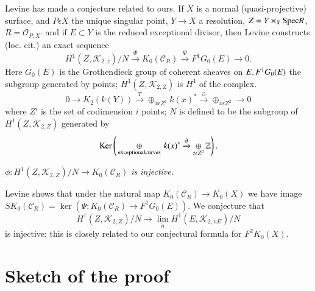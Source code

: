 Levine has made  a conjecture related to ours. If $X$ is a normal (quasi-projective) surface, and $P\epsilon X$ the unique singular point, $Y\to X$ a resolution, $Z=Y\times_{X}\spec R$, $R=\mathscr{O}_{P,X'}$ and if $E\subset Y$ is the reduced exceptional divisor, then Levine constructs (loc. cit.) an exact sequence 
$$
H^{1}(Z, \mathscr{K}_{2, z})/N \xrightarrow{\Phi} K_0(\mathscr{C}_R)\xrightarrow{\Psi} F^{1}G_0(E)\to 0. 
$$
Here $G_0(E)$ is the Grothendieck group of coherent sheaves on $E, F^{1}\\ G_0(E)$ the subgroup generated by points; $H^{1}(Z, \mathscr{K}_{2, Z})$ is $H^{1}$ of the complex. 
$$
0\to K_2(k(Y))\xrightarrow{T} \displaystyle\mathop{\oplus}_{x \epsilon Z^{1}} k(x)^{\ast} \xrightarrow{\partial} \displaystyle\mathop{\oplus}_{x \epsilon Z^{2}}\to 0
$$
where $Z^{i}$ is the set of codimension $i$ points; $N$ is defined to be the subgroup of $H^{1}(Z, \mathscr{K}_{2, Z})$ generated by 
$$
\ker \left(\displaystyle\mathop{\oplus}_{\text{ exceptional\\curves }}k(x)^{\ast}\xrightarrow{\partial}\displaystyle\mathop{\oplus}_{z \epsilon Z^{2}} \mathbb{Z}\right).
$$

\begin{conj} \textit{$\phi:H^{1}(Z, \mathscr{K}_{2, Z})/N\to K_0(\mathscr{C}_R)$ is injective.}\pageoriginale

Levine shows that under the natural map $K_0(\mathscr{C}_R)\to K_0(X)$ we have image $SK_0(\mathscr{C}_R)=\ker (\Psi: K_0(\mathscr{C}_R)\to F^{1}G_0(E))$. We conjecture that 
$$
H^{1}(Z, \mathscr{K}_{2, Z})/N\to \displaystyle\mathop{\lim}_{\overleftarrow{n}} H^{1}(E, \mathscr{K}_{2, n E})/N
$$ 
is injective; this is closely related to our conjectural formula for $F^{2}K_0(X)$. 
\end{conj}

\section{Sketch of the proof}

